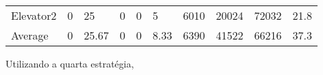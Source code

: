 \documentclass[a4paper]{article}
\begin{document}
\begin{table}[h]
\begin{tabular}{@{}llllllllll@{}}
Elevator2 & 0        & 25            & 0           & 0                                                               & 5                                                                  & 6010                                                         & 20024                                                 & 72032                                                   & 21.8         \\
Average   & 0     & 25.67         & 0        & 0                                                               & 8.33                                                               & 6390                                                         & 41522                                                 & 66216                                                   & 37.3          \\ \bottomrule
\end{tabular}
\end{table}

Utilizando a quarta estratégia,
\end{document}

